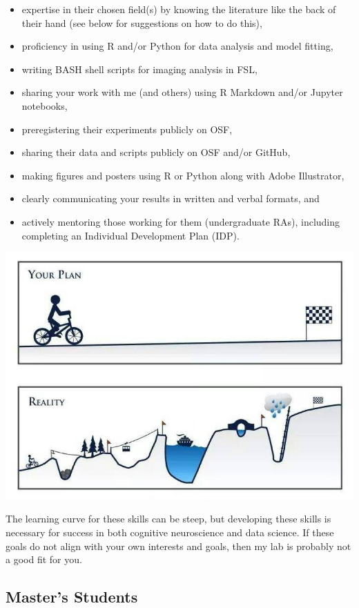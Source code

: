 \documentclass[]{book}
\providecommand{\tightlist}{%
  \setlength{\itemsep}{0pt}\setlength{\parskip}{0pt}}
\begin{document}
\begin{itemize}
\tightlist
\item
  expertise in their chosen field(s) by knowing the literature like the back of their hand (see below for suggestions on how to do this),
\item
  proficiency in using R and/or Python for data analysis and model fitting,
\item
  writing BASH shell scripts for imaging analysis in FSL,
\item
  sharing your work with me (and others) using R Markdown and/or Jupyter notebooks,
\item
  preregistering their experiments publicly on OSF,
\item
  sharing their data and scripts publicly on OSF and/or GitHub,
\item
  making figures and posters using R or Python along with Adobe Illustrator,
\item
  clearly communicating your results in written and verbal formats, and
\item
  actively mentoring those working for them (undergraduate RAs), including completing an Individual Development Plan (IDP).
\end{itemize}

\includegraphics{images/phdplan.jpg}

The learning curve for these skills can be steep, but developing these skills is necessary for success in both cognitive neuroscience and data science. If these goals do not align with your own interests and goals, then my lab is probably not a good fit for you.

\hypertarget{masters-students}{%
\subsection{Master's Students}\label{masters-students}}
\end{document}
